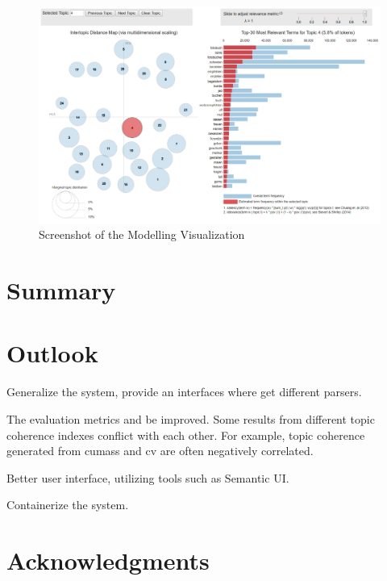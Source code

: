 \documentclass{article} %
\begin{document}
    \begin{figure}[H]
        \graphicspath{ {images/} }
        \begin{center}
            \includegraphics[scale=0.65, angle=-90]{vis_result.png}
        \end{center}
        \caption{Screenshot of the Modelling Visualization}
    \end{figure}
    \newpage
    \section{Summary}

    \section{Outlook}
    Generalize the system, provide an interfaces where get different parsers.

    The evaluation metrics and be improved. Some results from different topic coherence indexes conflict with each other. For example, topic coherence generated from c\textunderscore{}umass \cite{mimno_optimizing_nodate} and c\textunderscore{}v \cite{roder_exploring_2015} are often negatively correlated.

    Better user interface, utilizing tools such as Semantic UI.

    Containerize the system.


    \section*{Acknowledgments}

    
    
\end{document}
